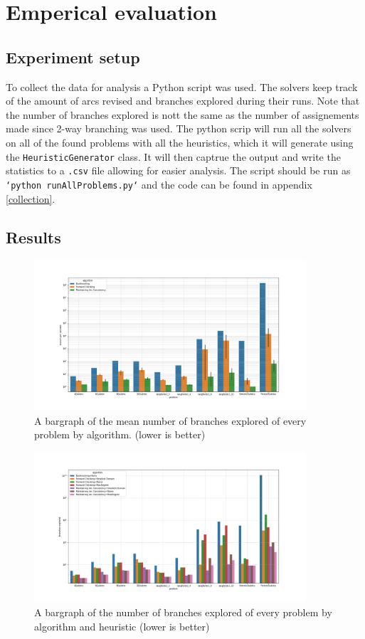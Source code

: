 \documentclass[british]{article}
\newcommand{\code}[1]{\texttt{#1}}
\begin{document}
\section{Emperical evaluation}
\subsection{Experiment setup}
To collect the data for analysis a Python script was used. The solvers keep track of the amount of arcs revised and branches explored during their runs. Note that the number of branches explored is nott the same as the number of assignements made since 2-way branching was used. The python scrip will run all the solvers on all of the found problems with all the heuristics, which it will generate using the \code{HeuristicGenerator} class. It will then captrue the output and write the statistics to a \code{.csv} file allowing for easier analysis. The script should be run as \code{`python runAllProblems.py`} and the code can be found in appendix \ref{collection}.

\subsection{Results}

\begin{figure}[!ht]
	\centering
	\includegraphics[width=0.9\textwidth]{meanBranchPerAlgo}
	\caption{A bargraph of the mean number of branches explored of every problem by algorithm. (lower is better)}
	\label{byAlgo}
\end{figure}

\begin{figure}[!ht]
	\centering
	\includegraphics[width=0.9\textwidth]{branchPerAlgoAndHeuristic}
	\caption{A bargraph of the number of branches explored of every problem by algorithm and heuristic (lower is better)}
	\label{byHeuristic}
\end{figure}
\end{document}
